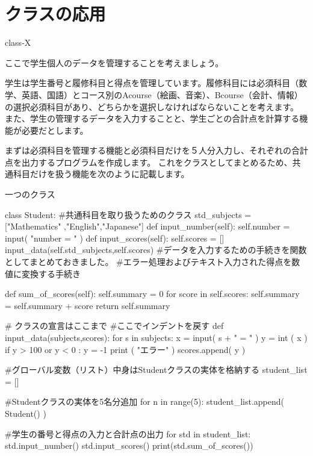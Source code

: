 \documentclass[11pt,a4paper,dvipdfmx,titlepage]{jsreport}
\begin{document}
\section{クラスの応用}
\begin{pabox}{class-X}

ここで学生個人のデータを管理することを考えましょう。

学生は学生番号と履修科目と得点を管理しています。履修科目には必須科目（数学、英語、国語）とコース別のAcourse（絵画、音楽）、Bcourse（会計、情報）の選択必須科目があり、どちらかを選択しなければならないことを考えます。
また、学生の管理するデータを入力することと、学生ごとの合計点を計算する機能が必要だとします。

まずは必須科目を管理する機能と必須科目だけを５人分入力し、それぞれの合計点を出力するプログラムを作成します。
これをクラスとしてまとめるため、共通科目だけを扱う機能を次のように記載します。
\end{pabox}
\begin{codebox2}{一つのクラス}
\begin{listing}{1}
class Student: #共通科目を取り扱うためのクラス
    std_subjects = ["Mathematics" ,"English","Japanese"]
    def input_number(self):
            self.number = input( "number = " )
    def input_scores(self):
            self.scores = []
            input_data(self.std_subjects,self.scores)
        #データを入力するための手続きを関数としてまとめておきました。
        #エラー処理およびテキスト入力された得点を数値に変換する手続き

    def sum_of_scores(self):
            self.summary = 0
            for score in self.scores:
                self.summary = self.summary + score
        return self.summary

    # クラスの宣言はここまで
#ここでインデントを戻す
def input_data(subjects,scores):
    for s in subjects:
        x = input( s + " = " )
        y = int ( x )
        if y > 100 or y < 0 :
            y = -1
            print ( "エラー" )
        scores.append( y )

#グローバル変数（リスト）中身はStudentクラスの実体を格納する
student_list = []

#Studentクラスの実体を5名分追加
for n in range(5):
	student_list.append( Student() )

#学生の番号と得点の入力と合計点の出力
for std in student_list:
    std.input_number()
    std.input_scores()
    print(std.sum_of_scores())
\end{listing}
\end{codebox2}
\end{document}

